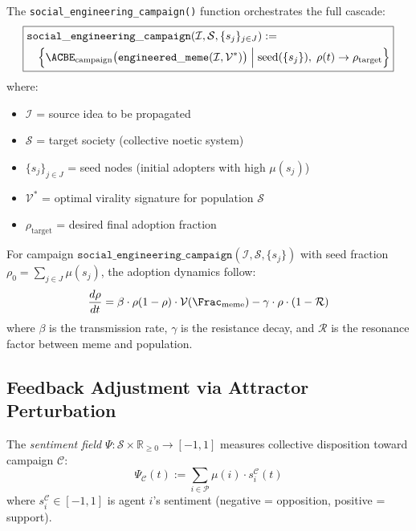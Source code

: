 \begin{definition}
\label{def:se-campaign}
The \texttt{social\_engineering\_campaign()} function orchestrates the full cascade:
\[
\boxed{
\begin{aligned}
    &\mathtt{social\_engineering\_campaign}(\mathcal{I}, \mathcal{S}, \{s_j\}_{j \in J}) := \\
    &\quad \Bigl\{ \ACBE_{\mathrm{campaign}}\bigl(\mathtt{engineered\_meme}(\mathcal{I}, \mathcal{V}^*)\bigr)
    \;\Big|\; \mathrm{seed}(\{s_j\}), \; \rho(t) \to \rho_{\mathrm{target}} \Bigr\}
\end{aligned}
}
\]
where:
\begin{itemize}
    \item $\mathcal{I}$ = source idea to be propagated
    \item $\mathcal{S}$ = target society (collective noetic system)
    \item $\{s_j\}_{j \in J}$ = seed nodes (initial adopters with high $\mu(s_j)$)
    \item $\mathcal{V}^*$ = optimal virality signature for population $\mathcal{S}$
    \item $\rho_{\mathrm{target}}$ = desired final adoption fraction
\end{itemize}
\end{definition}

\begin{theorem}
\label{thm:cascade-propagation}
For campaign $\mathtt{social\_engineering\_campaign}(\mathcal{I}, \mathcal{S}, \{s_j\})$ with seed fraction $\rho_0 = \sum_{j \in J} \mu(s_j)$, the adoption dynamics follow:
\[
    \frac{d\rho}{dt} = \beta \cdot \rho(1 - \rho) \cdot \mathcal{V}(\Frac_{\mathrm{meme}})
    - \gamma \cdot \rho \cdot (1 - \mathcal{R})
\]
where $\beta$ is the transmission rate, $\gamma$ is the resistance decay, and $\mathcal{R}$ is the resonance factor between meme and population.
\end{theorem}

\subsection{Feedback Adjustment via Attractor Perturbation}

\begin{definition}
\label{def:sentiment-field}
The \emph{sentiment field} $\Psi : \mathcal{S} \times \mathbb{R}_{\geq 0} \to [-1, 1]$ measures collective disposition toward campaign $\mathcal{C}$:
\[
    \Psi_{\mathcal{C}}(t) := \sum_{i \in \mathcal{P}} \mu(i) \cdot s_i^{\mathcal{C}}(t)
\]
where $s_i^{\mathcal{C}} \in [-1, 1]$ is agent $i$'s sentiment (negative = opposition, positive = support).
\end{definition}

